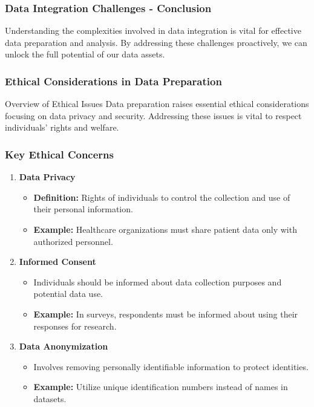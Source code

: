 \documentclass{beamer}
\begin{document}
\begin{frame}[fragile]
    \frametitle{Data Integration Challenges - Conclusion}
    Understanding the complexities involved in data integration is vital for effective data preparation and analysis. By addressing these challenges proactively, we can unlock the full potential of our data assets.
\end{frame}

\begin{frame}[fragile]
    \frametitle{Ethical Considerations in Data Preparation}
    \begin{block}{Overview of Ethical Issues}
        Data preparation raises essential ethical considerations focusing on data privacy and security. 
        Addressing these issues is vital to respect individuals' rights and welfare.
    \end{block}
\end{frame}

\begin{frame}[fragile]
    \frametitle{Key Ethical Concerns}
    \begin{enumerate}
        \item \textbf{Data Privacy} 
        \begin{itemize}
            \item \textbf{Definition:} Rights of individuals to control the collection and use of their personal information.
            \item \textbf{Example:} Healthcare organizations must share patient data only with authorized personnel.
        \end{itemize}
        
        \item \textbf{Informed Consent}
        \begin{itemize}
            \item Individuals should be informed about data collection purposes and potential data use.
            \item \textbf{Example:} In surveys, respondents must be informed about using their responses for research.
        \end{itemize}

        \item \textbf{Data Anonymization}
        \begin{itemize}
            \item Involves removing personally identifiable information to protect identities.
            \item \textbf{Example:} Utilize unique identification numbers instead of names in datasets.
        \end{itemize}
    \end{enumerate}
\end{frame}
\end{document}
